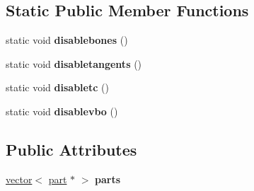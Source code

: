 \subsection*{Static Public Member Functions}
\begin{DoxyCompactItemize}
\item 
\mbox{\label{structanimmodel_a292961d8709679a14340cf3c3068ef6a}} 
static void {\bfseries disablebones} ()
\item 
\mbox{\label{structanimmodel_a943cf15df5f77f3eb757c4b8034fe51f}} 
static void {\bfseries disabletangents} ()
\item 
\mbox{\label{structanimmodel_a6f54e99a87cbdf411e425f25bd9e7335}} 
static void {\bfseries disabletc} ()
\item 
\mbox{\label{structanimmodel_a4534bf9318c152d8d9c41c6be15e3a87}} 
static void {\bfseries disablevbo} ()
\end{DoxyCompactItemize}
\subsection*{Public Attributes}
\begin{DoxyCompactItemize}
\item 
\mbox{\label{structanimmodel_a41c52c3feba8bec721c71ff93db11c4a}} 
\hyperlink{structvector}{vector}$<$ \hyperlink{structanimmodel_1_1part}{part} $\ast$ $>$ {\bfseries parts}
\end{DoxyCompactItemize}
